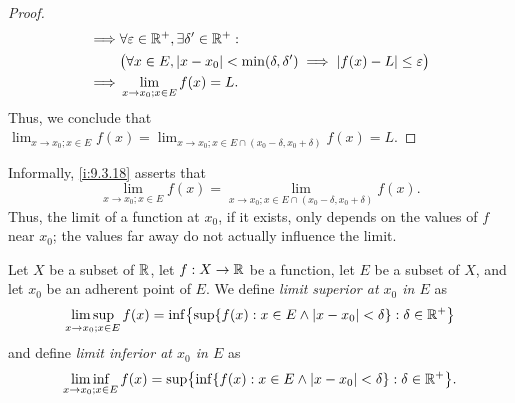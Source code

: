 \begin{proof}
\begin{align*}
    \implies & \forall \varepsilon \in \mathbb{R}^+, \exists \delta' \in \mathbb{R}^+ :                                                                              \\
             & \big(\forall x \in E, \left\lvert x - x_0\right\rvert < \min(\delta, \delta') \implies \left\lvert f(x) - L\right\rvert \leq \varepsilon\big)                             \\
    \implies & \lim_{x \to x_0 ; x \in E} f(x) = L.
  \end{align*}
  Thus, we conclude that \(\lim_{x \to x_0 ; x \in E} f(x) = \lim_{x \to x_0 ; x \in E \cap (x_0 - \delta, x_0 + \delta)} f(x) = L\).
\end{proof}

\begin{note}
  Informally, \cref{i:9.3.18} asserts that
  \[
    \lim_{x \to x_0 ; x \in E} f(x) = \lim_{x \to x_0 ; x \in E \cap (x_0 - \delta, x_0 + \delta)} f(x).
  \]
  Thus, the limit of a function at \(x_0\), if it exists, only depends on the values of \(f\) near \(x_0\);
  the values far away do not actually influence the limit.
\end{note}

\begin{ac}\label{i:ac:9.3.1}
  Let \(X\) be a subset of \(\mathbb{R}\), let \(f : X \to \mathbb{R}\) be a function, let \(E\) be a subset of \(X\), and let \(x_0\) be an adherent point of \(E\).
  We define \emph{limit superior at \(x_0\) in \(E\)} as
  \[
    \limsup_{x \to x_0 ; x \in E} f(x) = \inf\set{\sup\set{f(x) : x \in E \land \abs{x - x_0} < \delta} : \delta \in \R^+}
  \]
  and define \emph{limit inferior at \(x_0\) in \(E\)} as
  \[
    \liminf_{x \to x_0 ; x \in E} f(x) = \sup\set{\inf\set{f(x) : x \in E \land \abs{x - x_0} < \delta} : \delta \in \R^+}.
  \]
\end{ac}

